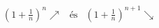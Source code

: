 \begin{gather*}
{\left( 1+\frac{1}{n}\right)}^{n} \nearrow \ \ \text{ és } \ \ 
      {\left( 1+\frac{1}{n}\right)}^{n+1} \searrow
\end{gather*}
